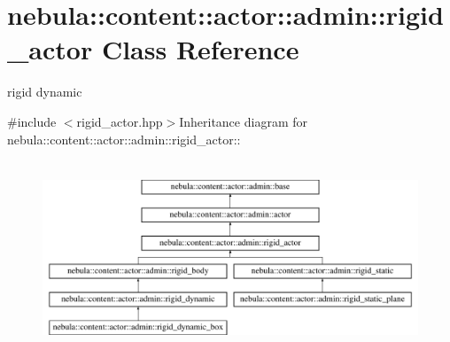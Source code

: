 \hypertarget{classnebula_1_1content_1_1actor_1_1admin_1_1rigid__actor}{
\section{nebula::content::actor::admin::rigid\_\-actor Class Reference}
\label{classnebula_1_1content_1_1actor_1_1admin_1_1rigid__actor}
}


rigid dynamic  


{\ttfamily \#include $<$rigid\_\-actor.hpp$>$}Inheritance diagram for nebula::content::actor::admin::rigid\_\-actor::\begin{figure}[H]
\begin{center}
\leavevmode
\includegraphics[height=5.7732cm]{classnebula_1_1content_1_1actor_1_1admin_1_1rigid__actor}
\end{center}
\end{figure}

